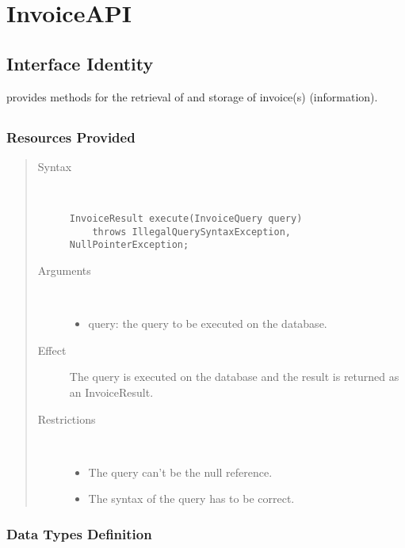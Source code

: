 \section{InvoiceAPI}
\label{api:invoice-api}

\subsection{Interface Identity}

\npar {} provides methods for the retrieval of and storage
of invoice(s) (information).

\subsection{}

\subsubsection{Resources Provided}

\begin{quote}
	\begin{description}
		\item[Syntax] \
		\begin{verbatim}
InvoiceResult execute(InvoiceQuery query)
    throws IllegalQuerySyntaxException, NullPointerException;
		\end{verbatim}
		\item[Arguments] \
		\begin{itemize}
		  \item query: the query to be executed on the database. 
		\end{itemize}
		\item[Effect] The query is executed on the database and the result is returned
		as an InvoiceResult. 
		\item[Restrictions] \
		\begin{itemize}
		  \item The query can't be the null reference.
		  \item The syntax of the query has to be correct.
		\end{itemize}
	\end{description} 
\end{quote}

\subsubsection{Data Types Definition}

